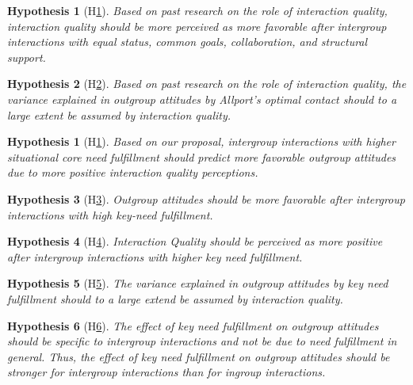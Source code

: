 \documentclass[man, 12pt, a4paper, mask]{apa7}
\theoremstyle{break}
\theoremstyle{plain}
\newtheorem{hyp}{Hypothesis}
\newtheorem{subhyp}{Hypothesis}
\begin{document}
\begin{subhyp}[H\ref{hyp:AllportsQuality}] \label{hyp:AllportsQuality}
\addtolength{\leftskip}{2.5em}
Based on past research on the role of interaction quality, interaction quality should be more perceived as more favorable after intergroup interactions with equal status, common goals, collaboration, and structural support.
\end{subhyp}

\begin{subhyp}[H\ref{hyp:AllportsQualityMediation}] \label{hyp:AllportsQualityMediation}
\addtolength{\leftskip}{2.5em}
Based on past research on the role of interaction quality, the variance explained in outgroup attitudes by Allport's optimal contact should to a large extent be assumed by interaction quality.
\end{subhyp}

\begin{hyp}[H\ref{hyp:keyNeed}] \label{hyp:keyNeed}
Based on our proposal, intergroup interactions with higher situational core need fulfillment should predict more favorable outgroup attitudes due to more positive interaction quality perceptions.
\end{hyp}

\setcounter{subhyp}{0}
\begin{subhyp}[H\ref{hyp:keyNeedPred}] \label{hyp:keyNeedPred}
\addtolength{\leftskip}{2.5em}
Outgroup attitudes should be more favorable after intergroup interactions with high key-need fulfillment.
\end{subhyp}

\begin{subhyp}[H\ref{hyp:keyNeedQual}] \label{hyp:keyNeedQual}
\addtolength{\leftskip}{2.5em}
Interaction Quality should be perceived as more positive after intergroup interactions with higher key need fulfillment.
\end{subhyp}

\begin{subhyp}[H\ref{hyp:keyNeedMediation}] \label{hyp:keyNeedMediation}
\addtolength{\leftskip}{2.5em}
The variance explained in outgroup attitudes by key need fulfillment should to a large extend be assumed by interaction quality.
\end{subhyp}

\begin{subhyp}[H\ref{hyp:keyNeedContactType}] \label{hyp:keyNeedContactType}
\addtolength{\leftskip}{2.5em}
The effect of key need fulfillment on outgroup attitudes should be specific to intergroup interactions and not be due to need fulfillment in general. Thus, the effect of key need fulfillment on outgroup attitudes should be stronger for intergroup interactions than for ingroup interactions. 
\end{subhyp}
\end{document}
